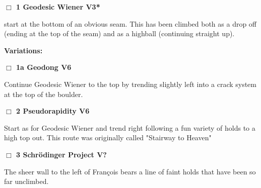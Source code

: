 \begin{multicols}{2}
\needspace{2em}
\label{rt:Geodesic Wiener}
\colorbox{green!20}{
\parbox{0.95\linewidth}{
\hspace{-1ex}\textbf{$\Box$
1 Geodesic Wiener V3*  
}}}
\begin{adjustwidth}{1.3em}{}			

start at the bottom of an obvious seam. This has been climbed both as a drop off (ending at the top of the seam) and as a highball (continuing straight up).
\end{adjustwidth}


\begin{adjustwidth}{0.5cm}{}				
\needspace{4em}
\textbf{Variations:} \newline

\needspace{2em}
\label{vr:Geodong}
\colorbox{RoyalBlue!20}{
\parbox{0.95\linewidth}{
\hspace{-1ex}\textbf{$\Box$
1a Geodong V6  \warn\warn
}}}
\begin{adjustwidth}{1.3em}{}			

Continue Geodesic Wiener to the top by trending slightly left into a crack system at the top of the boulder.
\end{adjustwidth}



\end{adjustwidth}


\needspace{2em}
\label{rt:Pseudorapidity}
\colorbox{RoyalBlue!20}{
\parbox{0.95\linewidth}{
\hspace{-1ex}\textbf{$\Box$
2 Pseudorapidity V6  \warn\warn
}}}
\begin{adjustwidth}{1.3em}{}			

Start as for Geodesic Wiener and trend right following a fun variety of holds to a high top out. This route was originally called "Stairway to Heaven"
\end{adjustwidth}




\needspace{2em}
\label{rt:Schrödinger Project}
\colorbox{black!20}{
\parbox{0.95\linewidth}{
\hspace{-1ex}\textbf{$\Box$
3 Schrödinger Project V?  
}}}
\begin{adjustwidth}{1.3em}{}			

The sheer wall to the left of François bears a line of faint holds that have been so far unclimbed.
\end{adjustwidth}





\end{multicols}
